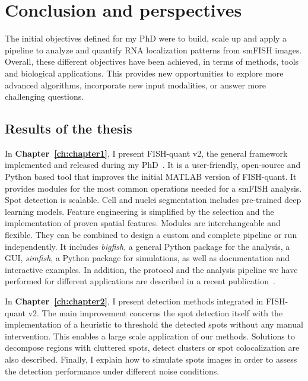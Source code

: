 
\chapter{Conclusion and perspectives}
\label{ch:conclusion}

\minitoc
\newpage

The initial objectives defined for my PhD were to build, scale up and apply a pipeline to analyze and quantify \ac{RNA} localization patterns from \ac{smFISH} images.
Overall, these different objectives have been achieved, in terms of methods, tools and biological applications.
This provides new opportunities to explore more advanced algorithms, incorporate new input modalities, or answer more challenging questions.

\section{Results of the thesis}
\label{sec:conclusion_thesis}

In \textbf{Chapter~\ref{ch:chapter1}}, I present FISH-quant v2, the general framework implemented and released during my PhD~\cite{Imbert_fq_2022}.
It is a user-friendly, open-source and Python based tool that improves the initial MATLAB version of FISH-quant.
It provides modules for the most common operations needed for a \ac{smFISH} analysis.
Spot detection is scalable.
Cell and nuclei segmentation includes pre-trained deep learning models.
Feature engineering is simplified by the selection and the implementation of proven spatial features.
Modules are interchangeable and flexible.
They can be combined to design a custom and complete pipeline or run independently.
It includes \emph{bigfish}, a general Python package for the analysis, a \ac{GUI}, \emph{simfish}, a Python package for simulations, as well as documentation and interactive examples.
In addition, the protocol and the analysis pipeline we have performed for different applications are described in a recent publication~\cite{safieddine_ht_smfish_2022}.

In \textbf{Chapter~\ref{ch:chapter2}}, I present detection methods integrated in FISH-quant v2.
The main improvement concerns the spot detection itself with the implementation of a heuristic to threshold the detected spots without any manual intervention.
This enables a large scale application of our methods.
Solutions to decompose regions with cluttered spots, detect clusters or spot colocalization are also described.
Finally, I explain how to simulate spots images in order to assess the detection performance under different noise conditions.

